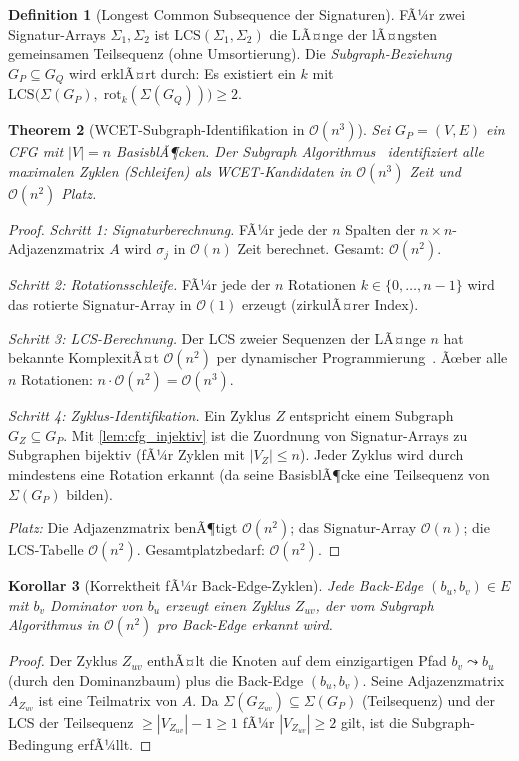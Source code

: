 ﻿\documentclass[a4paper,12pt]{article}
\theoremstyle{plain}
\newtheorem{theorem}{Theorem}[section]
\newtheorem{corollary}[theorem]{Korollar}
\theoremstyle{definition}
\newtheorem{definition}[theorem]{Definition}
\theoremstyle{remark}
\begin{document}
\begin{definition}[Longest Common Subsequence der Signaturen]\label{def:lcs}
FÃ¼r zwei Signatur-Arrays $\Sigma_1, \Sigma_2$ ist
$\mathrm{LCS}(\Sigma_1, \Sigma_2)$ die LÃ¤nge der lÃ¤ngsten gemeinsamen
Teilsequenz (ohne Umsortierung). Die \emph{Subgraph-Beziehung}
$G_P \subseteq G_Q$ wird erklÃ¤rt durch:
Es existiert ein $k$ mit
$\mathrm{LCS}\!\bigl(\Sigma(G_P),\; \mathrm{rot}_k(\Sigma(G_Q))\bigr) \geq 2$.
\end{definition}

\begin{theorem}[WCET-Subgraph-Identifikation in $\mathcal{O}(n^3)$]
\label{thm:wcet_complexity}
Sei $G_P = (V, E)$ ein CFG mit $|V| = n$ BasisblÃ¶cken.
Der Subgraph Algorithmus~\cite{epp2026c} identifiziert alle
maximalen Zyklen (Schleifen) als WCET-Kandidaten in
$\mathcal{O}(n^3)$ Zeit und $\mathcal{O}(n^2)$ Platz.
\end{theorem}
\begin{proof}
\textit{Schritt 1: Signaturberechnung.}
FÃ¼r jede der $n$ Spalten der $n \times n$-Adjazenzmatrix $A$ wird
$\sigma_j$ in $\mathcal{O}(n)$ Zeit berechnet. Gesamt:
$\mathcal{O}(n^2)$.

\textit{Schritt 2: Rotationsschleife.}
FÃ¼r jede der $n$ Rotationen $k \in \{0,\ldots,n-1\}$ wird das
rotierte Signatur-Array in $\mathcal{O}(1)$ erzeugt (zirkulÃ¤rer Index).

\textit{Schritt 3: LCS-Berechnung.}
Der LCS zweier Sequenzen der LÃ¤nge $n$ hat bekannte KomplexitÃ¤t
$\mathcal{O}(n^2)$ per dynamischer Programmierung~\cite{cormen2022}.
Ãœber alle $n$ Rotationen: $n \cdot \mathcal{O}(n^2) = \mathcal{O}(n^3)$.

\textit{Schritt 4: Zyklus-Identifikation.}
Ein Zyklus $Z$ entspricht einem Subgraph $G_Z \subseteq G_P$.
Mit \cref{lem:cfg_injektiv} ist die Zuordnung von Signatur-Arrays
zu Subgraphen bijektiv (fÃ¼r Zyklen mit $|V_Z| \leq n$).
Jeder Zyklus wird durch mindestens eine Rotation erkannt
(da seine BasisblÃ¶cke eine Teilsequenz von $\Sigma(G_P)$ bilden).

\textit{Platz:} Die Adjazenzmatrix benÃ¶tigt $\mathcal{O}(n^2)$;
das Signatur-Array $\mathcal{O}(n)$; die LCS-Tabelle $\mathcal{O}(n^2)$.
Gesamtplatzbedarf: $\mathcal{O}(n^2)$.
\end{proof}

\begin{corollary}[Korrektheit fÃ¼r Back-Edge-Zyklen]\label{cor:backedge}
Jede Back-Edge $(b_u, b_v) \in E$ mit $b_v$ Dominator von $b_u$
erzeugt einen Zyklus $Z_{uv}$, der vom Subgraph Algorithmus in
$\mathcal{O}(n^2)$ pro Back-Edge erkannt wird.
\end{corollary}
\begin{proof}
Der Zyklus $Z_{uv}$ enthÃ¤lt die Knoten auf dem einzigartigen
Pfad $b_v \leadsto b_u$ (durch den Dominanzbaum) plus die
Back-Edge $(b_u, b_v)$. Seine Adjazenzmatrix $A_{Z_{uv}}$
ist eine Teilmatrix von $A$. Da
$\Sigma(G_{Z_{uv}}) \subseteq \Sigma(G_P)$ (Teilsequenz)
und der LCS der Teilsequenz $\geq |V_{Z_{uv}}|-1 \geq 1$
fÃ¼r $|V_{Z_{uv}}| \geq 2$ gilt, ist die Subgraph-Bedingung erfÃ¼llt.
\end{proof}
\end{document}
